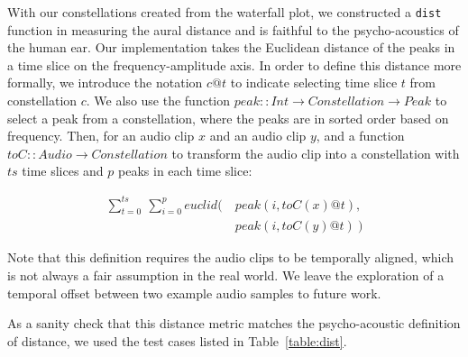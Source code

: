 With our constellations created from the waterfall plot, we constructed a \texttt{dist} function in measuring the aural distance and is faithful to the psycho-acoustics of the human ear.
Our implementation takes the Euclidean distance of the peaks in a time slice on the frequency-amplitude axis.
In order to define this distance more formally, we introduce the notation $c@t$ to indicate selecting time slice $t$ from constellation $c$.
We also use the function $peak:: Int \to Constellation \to Peak$ to select a peak from a constellation, where the peaks are in sorted order based on frequency.
Then, for an audio clip $x$ and an audio clip $y$, and a function $toC :: Audio \to Constellation$ to transform the audio clip into a constellation with $ts$ time slices and $p$ peaks in each time slice:

\begin{align*}
\sum_{t=0}^{ts}\ \sum_{i=0}^{p} euclid\Big(\ &peak(i,toC(x)@t), \\ &peak(i,toC(y)@t)\ \Big)
\end{align*}

Note that this definition requires the audio clips to be temporally aligned, which is not always a fair assumption in the real world. We leave the exploration of a temporal offset between two example audio samples to future work.

As a sanity check that this distance metric matches the psycho-acoustic definition of distance, we used the test cases listed in Table~\ref{table:dist}.

